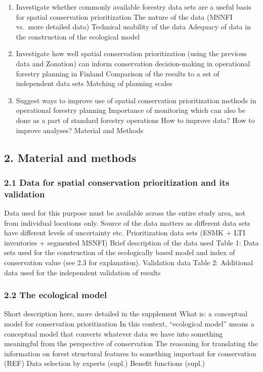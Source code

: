 \documentclass[]{article}
\begin{document}
\begin{enumerate}
\def\labelenumi{\arabic{enumi}.}
\itemsep1pt\parskip0pt
\item
  Investigate whether commonly available forestry data sets are a useful
  basis for spatial conservation prioritization The nature of the data
  (MSNFI vs.~more detailed data) Technical usability of the data
  Adequacy of data in the construction of the ecological model
\item
  Investigate how well spatial conservation prioritization (using the
  previous data and Zonation) can inform conservation decision-making in
  operational forestry planning in Finland Comparison of the results to
  a set of independent data sets Matching of planning scales
\item
  Suggest ways to improve use of spatial conservation prioritization
  methods in operational forestry planning Importance of monitoring
  which can also be done as a part of standard forestry operations How
  to improve data? How to improve analyses? Material and Methods
\end{enumerate}

\subsection{2. Material and methods}

\subsubsection{2.1 Data for spatial conservation prioritization and its
validation}

Data used for this purpose must be available across the entire study
area, not from individual locations only. Source of the data matters as
different data sets have different levels of uncertainty etc.
Prioritization data sets (ESMK + LTI inventories + segmented MSNFI)
Brief description of the data used Table 1: Data sets used for the
construction of the ecologically based model and index of conservation
value (see 2.3 for explanation). Validation data Table 2: Additional
data used for the independent validation of results

\subsubsection{2.2 The ecological model}

Short description here, more detailed in the supplement What is: a
conceptual model for conservation prioritization In this context,
``ecological model'' means a conceptual model that converts whatever
data we have into something meaningful from the perspective of
conservation The reasoning for translating the information on forest
structural features to something important for conservation (REF) Data
selection by experts (supl.) Benefit functions (supl.)
\end{document}
